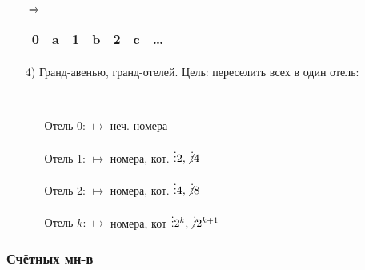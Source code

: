\begin{itemize}
\begin{solution}
    $\Rightarrow$
    \begin{center}
    \begin{tabular}{ |c|c|c|c|c|c|c| } 
     \hline
     0 & a & 1 & b & 2 & c & \ldots \\ 
     \hline
    \end{tabular}
    \end{center}
    \end{solution}
  \item [4) ]  Гранд-авенью, гранд-отелей. Цель: переселить всех в один отель:
    \begin{solution}
  ~\newline
    \begin{itemize}
      \item [Отель 0:] $\mapsto$ неч. номера
      \item [Отель 1: ] $\mapsto$ номера, кот. $\vdots 2, \not\vdots 4$
      \item [Отель 2:]  $\mapsto$ номера, кот. $\vdots 4, \not\vdots 8$
      \item [Отель $k$:] $\mapsto$ номера, кот $\vdots 2^{k}, \not\vdots 2^{k + 1}$
    \end{itemize}
    \end{solution}
\end{itemize}

\subsubsection{Счётных мн-в}

